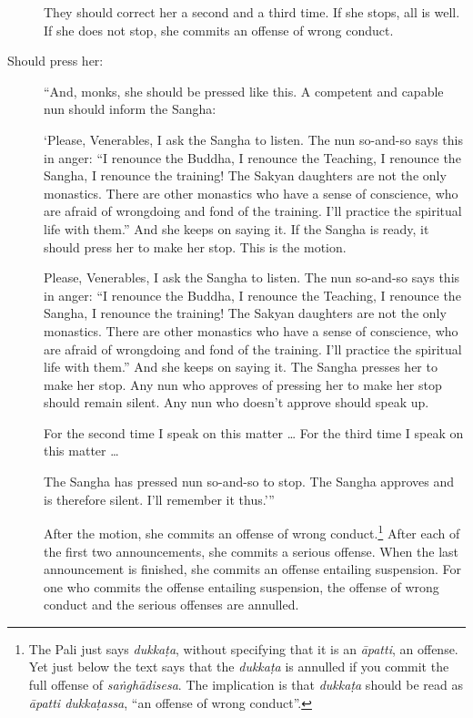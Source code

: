 \documentclass[12pt,openany]{book}%
\begin{document}
\begin{description}
They should correct her a second and a third time. If she stops, all is well.  If she does not stop, she commits an offense of wrong conduct. 

%
\item[Should press her: ] “And, monks, she should be pressed like this. A competent and capable nun should inform the Sangha: 

‘Please, Venerables, I ask the Sangha to listen. The nun so-and-so says this in anger: “I renounce the Buddha, I renounce the Teaching, I renounce the Sangha, I renounce the training! The Sakyan daughters are not the only monastics. There are other monastics who have a sense of conscience, who are afraid of wrongdoing and fond of the training. I’ll practice the spiritual life with them.” And she keeps on saying it. If the Sangha is ready, it should press her to make her stop. This is the motion. 

Please, Venerables, I ask the Sangha to listen. The nun so-and-so says this in anger: “I renounce the Buddha, I renounce the Teaching, I renounce the Sangha, I renounce the training! The Sakyan daughters are not the only monastics. There are other monastics who have a sense of conscience, who are afraid of wrongdoing and fond of the training. I’ll practice the spiritual life with them.” And she keeps on saying it. The Sangha presses her to make her stop. Any nun who approves of pressing her to make her stop should remain silent. Any nun who doesn’t approve should speak up. 

For the second time I speak on this matter … For the third time I speak on this matter … 

The Sangha has pressed nun so-and-so to stop. The Sangha approves and is therefore silent. I’ll remember it thus.’” 

After the motion, she commits an offense of wrong conduct.\footnote{The Pali just says \textit{\textsanskrit{dukkaṭa}}, without specifying that it is an \textit{\textsanskrit{āpatti}}, an offense. Yet just below the text says that the \textit{\textsanskrit{dukkaṭa}} is annulled if you commit the full offense of \textit{\textsanskrit{saṅghādisesa}}. The implication is that \textit{\textsanskrit{dukkaṭa}} should be read as \textit{\textsanskrit{āpatti} \textsanskrit{dukkaṭassa}}, “an offense of wrong conduct”. } After each of the first two announcements, she commits a serious offense. When the last announcement is finished, she commits an offense entailing suspension. For one who commits the offense entailing suspension, the offense of wrong conduct and the serious offenses are annulled. 


\end{description}
\end{document}
